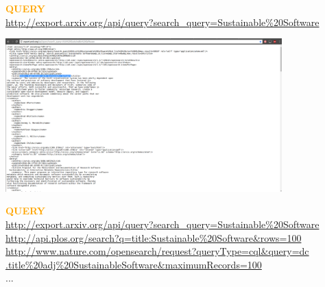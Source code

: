 \documentclass{beamer}
\begin{document}
\begin{frame}[fragile]
    \centering
    \textcolor{orange}{\textbf{QUERY}} \\
    \vspace{3mm}
    \small{\url{http://export.arxiv.org/api/query?search_query=Sustainable%20Software}} \\
\end{frame}

\begin{frame}
\begin{center}
    \includegraphics[width=0.8\textwidth]{static/arxiv_api_result.png}
\end{center}
\end{frame}

\begin{frame}[fragile]
    \begin{center}
    \textcolor{orange}{\textbf{QUERY}} \\
    \vspace{3mm}
    \small{\url{http://export.arxiv.org/api/query?search_query=Sustainable%20Software}} \\
    \pause
    \vspace{10mm}
    \small{\url{http://api.plos.org/search?q=title:Sustainable%20Software&rows=100}} \\
    \pause
    \vspace{10mm}
    \small{\url{http://www.nature.com/opensearch/request?queryType=cql&query=dc
    .title%
    \small{...}
    \end{center}
\end{frame}

\begin{frame}
    \begin{center}
    
    \end{center}
\end{frame}
\begin{frame}[fragile]
    \begin{center}
    
    \end{center}
\end{frame}
\end{document}
